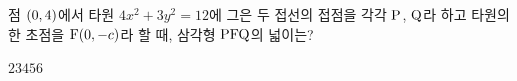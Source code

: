 점 $(0{,}\mkern3mu\mathopen{}4)$에서 타원 $4x^2+3y^2=12$에 그은 두 접선의 접점을 각각 $\mathrm{P}$, $\mathrm{Q}$라 하고 타원의 한 초점을 $\mathrm{F}(0{,}\mkern3mu\mathopen{}-c)$라 할 때, 삼각형 $\mathrm{PFQ}$의 넓이는? 
\begin{choices32}{$2$}{$3$}{$4$}{$5$}{$6$}\end{choices32}

